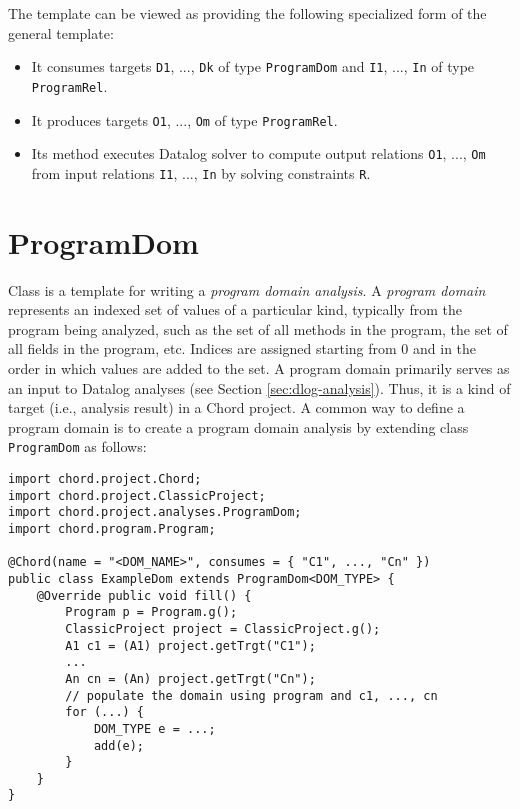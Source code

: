 The  template can be viewed as providing the following specialized
form of the general  template:
\begin{itemize}
\item
It consumes targets {\tt D1}, ..., {\tt Dk} of type {\tt ProgramDom} and {\tt I1}, ..., {\tt In} of type {\tt ProgramRel}.
\item
It produces targets {\tt O1}, ..., {\tt Om} of type {\tt ProgramRel}.
\item
Its  method executes Datalog solver  to compute output relations {\tt O1}, ..., {\tt Om} from input relations {\tt I1}, ..., {\tt In}
by solving constraints {\tt R}.
\end{itemize}

\section{ProgramDom}
\label{sec:program-dom}

Class  is a template
for writing a {\it program domain analysis}.
A {\it program domain} represents an indexed set of values of a particular kind, typically from the program being analyzed,
such as the set of all methods in the program, the set of all fields in the program, etc.
Indices are assigned starting from 0 and in the order in which values are added to the set.
A program domain primarily serves as an input to Datalog analyses (see Section \ref{sec:dlog-analysis}).
Thus, it is a kind of target (i.e., analysis result) in a Chord project.
A common way to define a program
domain is to create a program domain analysis by extending class {\tt ProgramDom} as follows:

\begin{framed}
\begin{verbatim}
import chord.project.Chord;
import chord.project.ClassicProject;
import chord.project.analyses.ProgramDom;
import chord.program.Program;

@Chord(name = "<DOM_NAME>", consumes = { "C1", ..., "Cn" })
public class ExampleDom extends ProgramDom<DOM_TYPE> {
    @Override public void fill() {
        Program p = Program.g();
        ClassicProject project = ClassicProject.g();
        A1 c1 = (A1) project.getTrgt("C1");
        ...
        An cn = (An) project.getTrgt("Cn");
        // populate the domain using program and c1, ..., cn
        for (...) {
            DOM_TYPE e = ...;
            add(e); 
        }
    }
}
\end{verbatim}
\end{framed}

